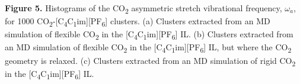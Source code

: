 \documentclass[]{article}
\begin{document}
\textbf{Figure 5.} Histograms of the CO\textsubscript{2} asymmetric
stretch vibrational frequency, \(\omega_{a}\), for 1000
CO\textsubscript{2}-{[}C\textsubscript{4}C\textsubscript{1}im{]}{[}PF\textsubscript{6}{]}
clusters. (a) Clusters extracted from an MD simulation of flexible
CO\textsubscript{2} in the
{[}C\textsubscript{4}C\textsubscript{1}im{]}{[}PF\textsubscript{6}{]}
IL. (b) Clusters extracted from an MD simulation of flexible
CO\textsubscript{2} in the
{[}C\textsubscript{4}C\textsubscript{1}im{]}{[}PF\textsubscript{6}{]}
IL, but where the CO\textsubscript{2} geometry is relaxed. (c) Clusters
extracted from an MD simulation of rigid CO\textsubscript{2} in the
{[}C\textsubscript{4}C\textsubscript{1}im{]}{[}PF\textsubscript{6}{]}
IL.
\end{document}
